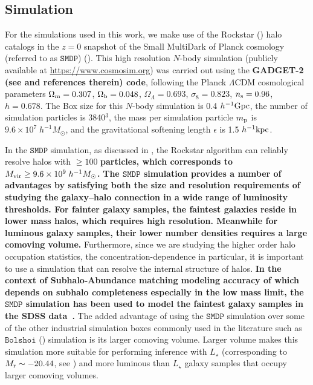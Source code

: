 \documentclass[12pt, preprint]{aastex}
\begin{document}
\subsection{Simulation}

For the simulations used in this work, we make use of the Rockstar (\citealt{rockstar}) halo catalogs in the $z=0$ snapshot of the Small MultiDark of Planck cosmology (referred to as $\mathtt{SMDP}$) (\citealt{smallmultidark}). This high resolution $N$-body simulation (publicly available at \url{https://www.cosmosim.org}) was carried out using the 
{\bf \color{dred} GADGET-2 (see \citealt{smallmultidark} and references therein) code}, 
following the Planck $\Lambda$CDM cosmological parameters 
$\Omega_{\rm m} = 0.307$, $\Omega_{\rm b} = 0.048$, $\Omega_{\Lambda} = 0.693$, $\sigma_{8} = 0.823$, $n_{\rm s}=0.96$, 
$h=0.678$. The Box size for this $N$-body simulation is 0.4 $h^{-1} \rm{Gpc}$, the number of simulation particles is 3840$^3$, the mass per simulation particle $m_{\rm p}$ is $9.6 \times 10^{7} \; h^{-1} M_{\odot}$, and the gravitational softening length $\epsilon$ is 1.5 $h^{-1} \rm{kpc}$.

In the $\mathtt{SMDP}$ simulation, as discussed in \citet{halodemographic}, the Rockstar algorithm can reliably resolve halos with $\geq 100$
{\bf \color{dred} particles, which corresponds to $M_{\rm vir} \geq 9.6 \times 10^{9} \; h^{-1}M_{\odot}$.}
{\bf \color{dred}
    The $\mathtt{SMDP}$ simulation provides a number of advantages by satisfying both the size 
    and resolution requirements of studying the galaxy--halo connection in a wide range of 
    luminosity thresholds. For fainter galaxy samples, the faintest galaxies reside in lower 
    mass halos, which requires high resolution. Meanwhile for luminous galaxy samples, their 
    lower number densities requires a large comoving volume. 
}
Furthermore, since we are studying the higher order halo occupation statistics, the concentration-dependence in particular, it is important to use a simulation that can resolve the internal structure of halos. 
{\bf \color{darkgreen}
    In the context of Subhalo-Abundance matching modeling accuracy of which depends on subhalo completeness especially in the low mass limit, the $\mathtt{SMDP}$ simulation has been used to model the faintest galaxy samples in the SDSS data~\citep[see][]{hod_vs_sham}. 
}
The added advantage of using the $\mathtt{SMDP}$ simulation over some of the other industrial simulation boxes commonly used in the literature such as $\mathtt{Bolshoi}$ (\citealt{Klypin2011,smallmultidark}) simulation is its larger comoving volume. Larger volume makes this simulation more suitable for performing inference with $L_{\star}$ (corresponding to $M_{\rm r} \sim -20.44$, see \citealt{blanton2003}) and more luminous than $L_{\star}$ galaxy samples that occupy larger comoving volumes.
\end{document}
